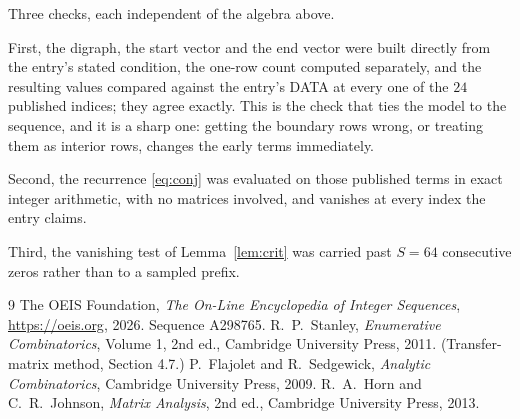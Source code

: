 \documentclass[11pt,a4paper]{article}
\theoremstyle{plain}
\theoremstyle{definition}
\begin{document}
Three checks, each independent of the algebra above.

First, the digraph, the start vector and the end vector were built directly from the
entry's stated condition, the one-row count computed separately, and the resulting values
compared against the entry's DATA at every one of the $24$ published indices; they
agree exactly. This is the check that ties the model to the sequence, and it is a sharp one:
getting the boundary rows wrong, or treating them as interior rows, changes the early terms
immediately.

Second, the recurrence \eqref{eq:conj} was evaluated on those published terms in exact
integer arithmetic, with no matrices involved, and vanishes at every index the entry claims.

Third, the vanishing test of Lemma~\ref{lem:crit} was carried past $S=64$ consecutive
zeros rather than to a sampled prefix.

\begin{thebibliography}{9}
 The OEIS Foundation, \emph{The On-Line Encyclopedia of Integer
Sequences}, \url{https://oeis.org}, 2026. Sequence A298765.
 R.~P.~Stanley, \emph{Enumerative Combinatorics}, Volume 1, 2nd ed.,
Cambridge University Press, 2011. (Transfer-matrix method, Section 4.7.)
 P.~Flajolet and R.~Sedgewick, \emph{Analytic Combinatorics}, Cambridge
University Press, 2009.
 R.~A.~Horn and C.~R.~Johnson, \emph{Matrix Analysis}, 2nd ed., Cambridge
University Press, 2013.
\end{thebibliography}
\end{document}

